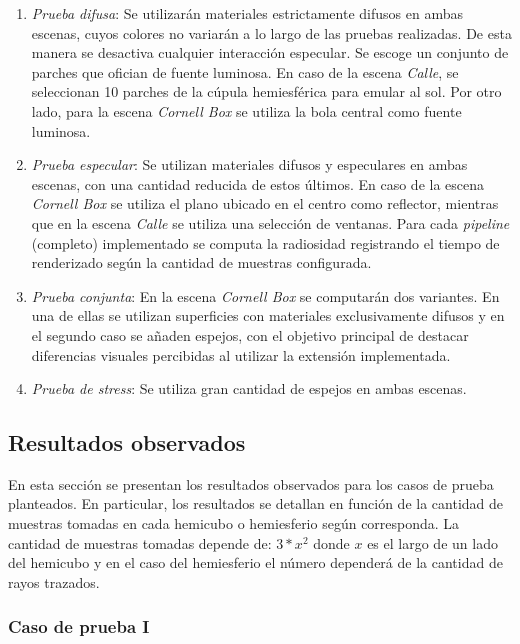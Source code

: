 \begin{enumerate}
	\item \textit{Prueba difusa}: Se utilizarán materiales estrictamente difusos en ambas escenas, cuyos colores no variarán a lo largo de las pruebas realizadas. De esta manera se desactiva cualquier interacción especular. Se escoge un conjunto de parches que ofician de fuente luminosa. En caso de la escena \textit{Calle}, se seleccionan 10 parches de la cúpula hemiesférica para emular al sol. Por otro lado, para la escena \textit{Cornell Box} se utiliza la bola central como fuente luminosa.
	\item \textit{Prueba especular}: Se utilizan materiales difusos y especulares en ambas escenas, con una cantidad reducida de estos últimos. En caso de la escena \textit{Cornell Box} se utiliza el plano ubicado en el centro como reflector, mientras que en la escena \textit{Calle} se utiliza una selección de ventanas. Para cada \textit{pipeline} (completo) implementado se computa la radiosidad registrando el tiempo de renderizado según la cantidad de muestras configurada.
	\item \textit{Prueba conjunta}: En la escena \textit{Cornell Box} se computarán dos variantes. En una de ellas se utilizan superficies con materiales exclusivamente difusos y en el segundo caso se añaden espejos, con el objetivo principal de destacar diferencias visuales percibidas al utilizar la extensión implementada.
	\item \textit{Prueba de stress}: Se utiliza gran cantidad de espejos en ambas escenas.
\end{enumerate}

\subsection{Resultados observados}

En esta sección se presentan los resultados observados para los casos de prueba planteados. En particular, los resultados se detallan en función de la cantidad de muestras tomadas en cada hemicubo o hemiesferio según corresponda. La cantidad de muestras tomadas depende de: $3 * x^{2}$ donde $x$ es el largo de un lado del hemicubo y en el caso del hemiesferio el número dependerá de la cantidad de rayos trazados.


\subsubsection{Caso de prueba I}

